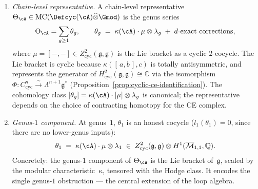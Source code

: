 \begin{theorem}
\begin{enumerate}[label=\textup{(\alph*)}]
\item \emph{Chain-level representative.}
  A chain-level representative
  $\Theta_{\cA} \in
  \operatorname{MC}(\Defcyc(\cA)\widehat{\otimes}\Gmod)$
  is the genus series
  \begin{equation}\label{eq:theta-chain}
  \Theta_{\cA} = \sum_{g \geq 1} \theta_g,
  \qquad
  \theta_g \;=\; \kappa(\cA) \cdot \mu \otimes \lambda_g
  \;+\; d\text{-exact corrections},
  \end{equation}
  where $\mu = [-,-] \in Z^2_{\mathrm{cyc}}(\mathfrak{g},
  \mathfrak{g})$ is the Lie bracket as a cyclic $2$-cocycle.
  The Lie bracket is cyclic because
  $\kappa([\,a,b\,],c)$ is totally antisymmetric, and
  represents the generator of
  $H^2_{\mathrm{cyc}}(\mathfrak{g},\mathfrak{g}) \cong
  \mathbb{C}$ via the isomorphism
  $\Phi \colon C^n_{\mathrm{cyc}} \xrightarrow{\sim}
  \Lambda^{n+1}\mathfrak{g}^*$
  \textup{(}Proposition~\textup{\ref{prop:cyclic-ce-identification}}\textup{)}.
  The cohomology class $[\theta_g] =
  \kappa(\cA)\cdot[\mu]\otimes\lambda_g$ is canonical;
  the representative depends on the choice of contracting homotopy
  for the CE complex.

\item \emph{Genus-$1$ component.}
  At genus~$1$, $\theta_1$ is an honest cocycle
  \textup{(}$l_1(\theta_1) = 0$, since there are no lower-genus
  inputs\textup{)}:
  \begin{equation}\label{eq:theta-genus1}
  \theta_1 \;=\; \kappa(\cA) \cdot \mu \otimes \lambda_1
  \;\in\;
  Z^2_{\mathrm{cyc}}(\mathfrak{g},\mathfrak{g})
  \otimes H^1(\overline{\mathcal{M}}_{1,1},\mathbb{Q}).
  \end{equation}
  Concretely: the genus-$1$ component of $\Theta_{\cA}$ is the
  Lie bracket of~$\mathfrak{g}$, scaled by the modular
  characteristic~$\kappa$, tensored with the Hodge class.
  It encodes the single genus-$1$ obstruction --- the central
  extension of the loop algebra.


\end{enumerate}
\end{theorem}
